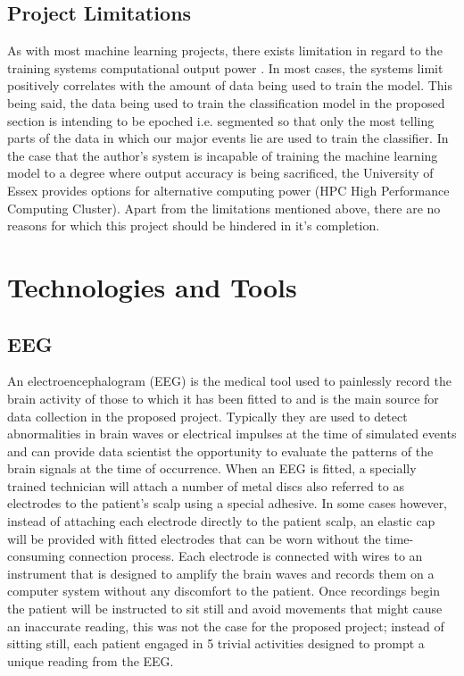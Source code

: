 \documentclass[12pt]{article}
\begin{document}
\subsection{Project Limitations}
As with most machine learning projects, there exists limitation in regard to the training systems computational output power \cite{DBLP:journals/corr/abs-2007-05558}. In most cases, the systems limit positively correlates with the amount of data being used to train the model. This being said, the data being used to train the classification model in the proposed section is intending to be epoched i.e. segmented so that only the most telling parts of the data in which our major events lie are used to train the classifier. In the case that the author’s system is incapable of training the machine learning model to a degree where output accuracy is being sacrificed, the University of Essex provides options for alternative computing power (HPC High Performance Computing Cluster). Apart from the limitations mentioned above, there are no reasons for which this project should be hindered in it’s completion.

\section{Technologies and Tools}
\subsection{EEG}
An electroencephalogram (EEG) is the medical tool used to painlessly record the brain activity of those to which it has been fitted to and is the main source for data collection in the proposed project. Typically they are used to detect abnormalities in brain waves or electrical impulses at the time of simulated events and can provide data scientist the opportunity to evaluate the patterns of the brain signals at the time of occurrence. 
When an EEG is fitted, a specially trained technician will attach a number of metal discs also referred to as electrodes to the patient’s scalp using a special adhesive. In some cases however, instead of attaching each electrode directly to the patient scalp, an elastic cap will be provided with fitted electrodes that can be worn without the time-consuming connection process. Each electrode is connected with wires to an instrument that is designed to amplify the brain waves and records them on a computer system without any discomfort to the patient. Once recordings begin the patient will be instructed to sit still and avoid movements that might cause an inaccurate reading, this was not the case for the proposed project; instead of sitting still, each patient engaged in 5 trivial activities designed to prompt a unique reading from the EEG.
\end{document}
